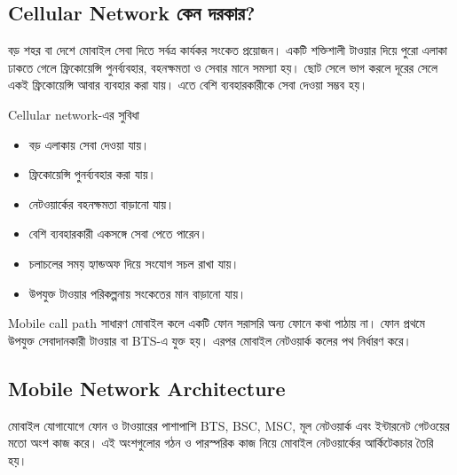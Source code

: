\subsection{Cellular Network কেন দরকার?}

বড় শহর বা দেশে মোবাইল সেবা দিতে সর্বত্র কার্যকর সংকেত প্রয়োজন। একটি শক্তিশালী টাওয়ার দিয়ে পুরো এলাকা ঢাকতে গেলে ফ্রিকোয়েন্সি পুনর্ব্যবহার, বহনক্ষমতা ও সেবার মানে সমস্যা হয়। ছোট সেলে ভাগ করলে দূরের সেলে একই ফ্রিকোয়েন্সি আবার ব্যবহার করা যায়। এতে বেশি ব্যবহারকারীকে সেবা দেওয়া সম্ভব হয়।

\begin{keypointbox}{Cellular network-এর সুবিধা}
\begin{itemize}
\item বড় এলাকায় সেবা দেওয়া যায়।
\item ফ্রিকোয়েন্সি পুনর্ব্যবহার করা যায়।
\item নেটওয়ার্কের বহনক্ষমতা বাড়ানো যায়।
\item বেশি ব্যবহারকারী একসঙ্গে সেবা পেতে পারেন।
\item চলাচলের সময় হ্যান্ডঅফ দিয়ে সংযোগ সচল রাখা যায়।
\item উপযুক্ত টাওয়ার পরিকল্পনায় সংকেতের মান বাড়ানো যায়।
\end{itemize}
\end{keypointbox}

\begin{mistakebox}{Mobile call path}
সাধারণ মোবাইল কলে একটি ফোন সরাসরি অন্য ফোনে কথা পাঠায় না। ফোন প্রথমে উপযুক্ত সেবাদানকারী টাওয়ার বা BTS-এ যুক্ত হয়। এরপর মোবাইল নেটওয়ার্ক কলের পথ নির্ধারণ করে।
\end{mistakebox}

\subsection{Mobile Network Architecture}

মোবাইল যোগাযোগে ফোন ও টাওয়ারের পাশাপাশি BTS, BSC, MSC, মূল নেটওয়ার্ক এবং ইন্টারনেট গেটওয়ের মতো অংশ কাজ করে। এই অংশগুলোর গঠন ও পারস্পরিক কাজ নিয়ে মোবাইল নেটওয়ার্কের আর্কিটেকচার তৈরি হয়।




